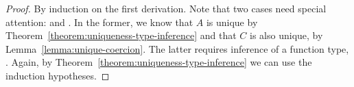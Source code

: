 \begin{proof}
  By induction on the first derivation.
  Note that two cases need special attention:  and .
  In the former, we know that $A$ is unique by Theorem~\ref{theorem:uniqueness-type-inference} and 
  that $C$ is also unique, by Lemma~\ref{lemma:unique-coercion}.
  The latter requires inference of a function type, .
  Again, by Theorem~\ref{theorem:uniqueness-type-inference} we can use the induction hypotheses.
\end{proof}

